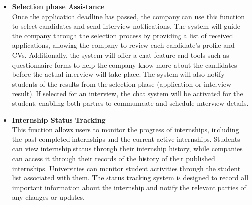 \begin{itemize}[label={ }]
    \item \textcolor{bluepoli}{\textbf{Selection phase Assistance}}
    \\Once the application deadline has passed, the company can use this function to select candidates and send interview notifications. The system will 
    guide the company through the selection process by providing a list of received applications, allowing the company to review each candidate's profile 
    and CVs. Additionally, the system will offer a chat feature and tools such as questionnaire forms to help the company know more about the candidates
    before the actual interview will take place.
    The system will also notify students of the results from the selection phase (application or interview result). If selected for an interview, the chat
    system will be activated for the student, enabling both parties to communicate and schedule interview details.

    \item \textcolor{bluepoli}{\textbf{Internship Status Tracking}}
    \\This function allows users to monitor the progress of internships, including the past completed internships and the current active internships.
    Students can view internship status through their internship history, while companies can access it through their records of the history of their 
    published internships. Universities can monitor student activities through the student list associated with them. The status tracking system
    is designed to record all important information about the internship and notify the relevant parties of any changes or updates.


\end{itemize}
